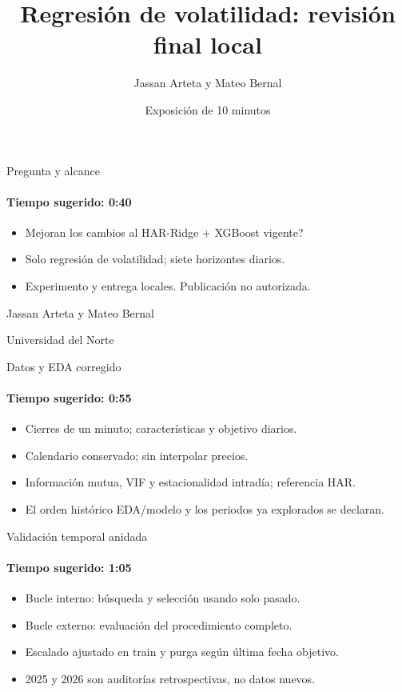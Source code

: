 \documentclass[aspectratio=169,10pt]{beamer}
\title{Regresión de volatilidad: revisión final local}
\author{Jassan Arteta y Mateo Bernal}
\institute{Universidad del Norte}
\date{Exposición de 10 minutos}
\begin{document}
\begin{frame}{Pregunta y alcance}
\framesubtitle{Tiempo sugerido: 0:40}
\begin{itemize}
\item \textquestiondown{}Mejoran los cambios al HAR-Ridge + XGBoost vigente?
\item Solo regresión de volatilidad; siete horizontes diarios.
\item Experimento y entrega locales. Publicación no autorizada.
\end{itemize}\par\bigskip\small Jassan Arteta y Mateo Bernal\par Universidad del Norte
\end{frame}
\begin{frame}{Datos y EDA corregido}
\framesubtitle{Tiempo sugerido: 0:55}
\begin{itemize}
\item Cierres de un minuto; características y objetivo diarios.
\item Calendario conservado; sin interpolar precios.
\item Información mutua, VIF y estacionalidad intradía; referencia HAR.
\item El orden histórico EDA/modelo y los periodos ya explorados se declaran.
\end{itemize}
\end{frame}
\begin{frame}{Validación temporal anidada}
\framesubtitle{Tiempo sugerido: 1:05}
\begin{itemize}
\item Bucle interno: búsqueda y selección usando solo pasado.
\item Bucle externo: evaluación del procedimiento completo.
\item Escalado ajustado en train y purga según última fecha objetivo.
\item 2025 y 2026 son auditorías retrospectivas, no datos nuevos.
\end{itemize}
\end{frame}
\end{document}
